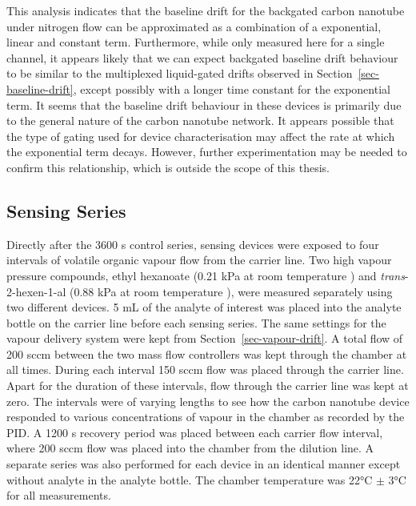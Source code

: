 \documentclass[
  a4paper,
]{scrbook}
\begin{document}
This analysis indicates that the baseline drift for the backgated carbon
nanotube under nitrogen flow can be approximated as a combination of a
exponential, linear and constant term. Furthermore, while only measured
here for a single channel, it appears likely that we can expect
backgated baseline drift behaviour to be similar to the multiplexed
liquid-gated drifts observed in Section~\ref{sec-baseline-drift}, except
possibly with a longer time constant for the exponential term. It seems
that the baseline drift behaviour in these devices is primarily due to
the general nature of the carbon nanotube network. It appears possible
that the type of gating used for device characterisation may affect the
rate at which the exponential term decays. However, further
experimentation may be needed to confirm this relationship, which is
outside the scope of this thesis.

\hypertarget{sec-vapour-series}{%
\subsection{Sensing Series}\label{sec-vapour-series}}

Directly after the 3600 s control series, sensing devices were exposed
to four intervals of volatile organic vapour flow from the carrier line.
Two high vapour pressure compounds, ethyl hexanoate (0.21 kPa at room
temperature \autocite{EtHex}) and \emph{trans}-2-hexen-1-al (0.88 kPa at
room temperature \autocite{E2Hex}), were measured separately using two
different devices. 5 mL of the analyte of interest was placed into the
analyte bottle on the carrier line before each sensing series. The same
settings for the vapour delivery system were kept from
Section~\ref{sec-vapour-drift}. A total flow of 200 sccm between the two
mass flow controllers was kept through the chamber at all times. During
each interval 150 sccm flow was placed through the carrier line. Apart
for the duration of these intervals, flow through the carrier line was
kept at zero. The intervals were of varying lengths to see how the
carbon nanotube device responded to various concentrations of vapour in
the chamber as recorded by the PID. A 1200 s recovery period was placed
between each carrier flow interval, where 200 sccm flow was placed into
the chamber from the dilution line. A separate series was also performed
for each device in an identical manner except without analyte in the
analyte bottle. The chamber temperature was 22°C \(\pm\) 3°C for all
measurements.
\end{document}
